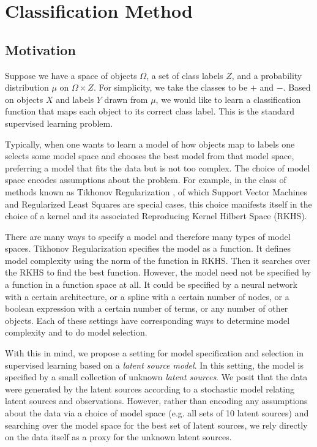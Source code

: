 \chapter{Classification Method}
\label{ch:method}

\section{Motivation}
Suppose we have a space of objects $\Omega$, a set of class labels $Z$, and a
probability distribution $\mu$ on $\Omega \times Z$. For simplicity, we take the
classes to be $+$ and $-$. Based on objects $X$ and labels $Y$ drawn from $\mu$,
we would like to learn a classification function that maps each object to its
correct class label. This is the standard supervised learning problem.

Typically, when one wants to learn a model of how objects map to labels one
selects some model space and chooses the best model from that model space,
preferring a model that fits the data but is not too complex. The choice of model
space encodes assumptions about the problem. For example, in the class of
methods known as Tikhonov Regularization \cite{Poggio}\cite{Bauer}, of which
Support Vector Machines and Regularized Least Squares are special cases, this
choice manifests itself in the choice of a kernel and its associated Reproducing
Kernel Hilbert Space (RKHS).

There are many ways to specify a model and therefore many types of model
spaces. Tikhonov Regularization specifies the model as a function. It defines
model complexity using the norm of the function in RKHS. Then it searches over
the RKHS to find the best function. However, the model need not be specified by
a function in a function space at all. It could be specified by a neural network
with a certain architecture, or a spline with a certain number of nodes, or a
boolean expression with a certain number of terms, or any number of other
objects. Each of these settings have corresponding ways to determine model
complexity and to do model selection.

With this in mind, we propose a setting for model specification and selection in
supervised learning based on a {\em latent source model}. In this setting, the
model is specified by a small collection of unknown {\em latent sources}. We
posit that the data were generated by the latent sources according to a
stochastic model relating latent sources and observations. However, rather than
encoding any assumptions about the data via a choice of model space (e.g. all
sets of 10 latent sources) and searching over the model space for the best set
of latent sources, we rely directly on the data itself as a proxy for the
unknown latent sources.

